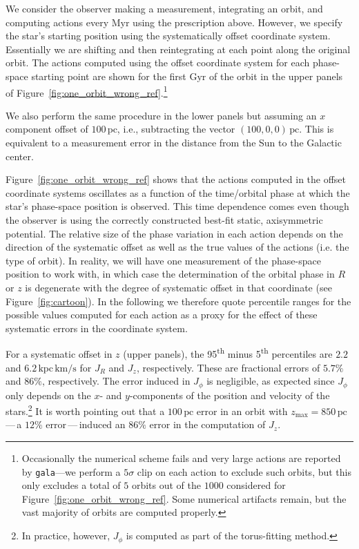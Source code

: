 \documentclass[twocolumn]{aastex62}
\newcommand{\pc}{\text{pc}}
\newcommand{\Myr}{\text{Myr}}
\newcommand{\Gyr}{\text{Gyr}}
\newcommand{\kms}{\text{km}/\text{s}}
\newcommand{\actunit}{\text{kpc}\,\kms}
\begin{document}
We consider the observer making a measurement, integrating an orbit, and
computing actions every $\Myr$ using the prescription above. However, we
specify the star's starting position using the systematically offset
coordinate system.
Essentially we are shifting and then reintegrating at each point along the original orbit.
The actions computed using the offset coordinate system
for each phase-space starting point are shown for the first $\Gyr$ of the
orbit in the upper panels of
Figure~\ref{fig:one_orbit_wrong_ref}.\footnote{Occasionally the numerical
scheme fails and very large actions are reported by \texttt{gala}---we perform
a $5\sigma$ clip on each action to exclude such orbits, but this only excludes
a total of $5$ orbits out of the $1000$ considered for
Figure~\ref{fig:one_orbit_wrong_ref}. Some numerical artifacts remain, but the
vast majority of orbits are computed properly.}

We also perform the same procedure in the lower panels but assuming an $x$
component offset of $100\,\pc$, i.e., subtracting the vector $(100, 0,
0)\,\pc$. This is equivalent to a measurement error in the distance from the
Sun to the Galactic center.

Figure~\ref{fig:one_orbit_wrong_ref} shows that the actions computed in the
offset coordinate systems oscillates as a function of the time/orbital phase at which the
star's phase-space position is observed.
This time dependence comes even though
the observer is using the correctly constructed best-fit static, axisymmetric
potential. The relative size of the phase variation in each action depends on
the direction of the systematic offset as well as the true values of the
actions (i.e. the type of orbit). In reality, we will have one measurement of
the phase-space position to work with, in which case the determination of the
orbital phase in $R$ or $z$ is degenerate with the degree of systematic offset
in that coordinate (see Figure~\ref{fig:cartoon}). In the following we
therefore quote percentile ranges for the possible values computed for each
action as a proxy for the effect of these systematic errors in the coordinate
system.

For a systematic offset in $z$ (upper panels), the 95\textsuperscript{th}
minus 5\textsuperscript{th} percentiles are $2.2$ and $6.2\,\actunit$ for
$J_R$ and $J_z$, respectively. These are fractional errors of $5.7\%$ and
$86\%$, respectively. The error induced in $J_{\phi}$ is negligible, as
expected since $J_{\phi}$ only depends on the $x$- and $y$-components of the
position and velocity of the stars.\footnote{In practice, however, $J_{\phi}$
is computed as part of the torus-fitting method.} It is worth pointing out
that a $100\,\pc$ error in an orbit with $z_{\text{max}}=850\,\pc$\,---\,a
$12\%$ error\,---\,induced an $86\%$ error in the computation of $J_z$.
\end{document}
